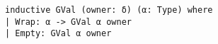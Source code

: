 \begin{lstlisting}[language=lean]
inductive GVal (owner: δ) (α: Type) where
| Wrap: α -> GVal α owner
| Empty: GVal α owner
\end{lstlisting}
